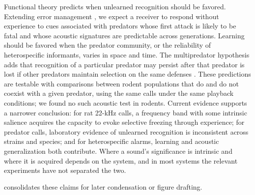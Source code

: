 Functional theory predicts when unlearned recognition should be favored. Extending error management \citep{Nesse2005}, we expect a receiver to respond without experience to cues associated with predators whose first attack is likely to be fatal and whose acoustic signatures are predictable across generations. Learning should be favored when the predator community, or the reliability of heterospecific informants, varies in space and time. The multipredator hypothesis adds that recognition of a particular predator may persist after that predator is lost if other predators maintain selection on the same defenses \citep{Blumstein2006}. These predictions are testable with comparisons between rodent populations that do and do not coexist with a given predator, using the same calls under the same playback conditions; we found no such acoustic test in rodents. Current evidence supports a narrower conclusion: for rat 22-kHz calls, a frequency band with some intrinsic salience acquires the capacity to evoke selective freezing through experience; for predator calls, laboratory evidence of unlearned recognition is inconsistent across strains and species; and for heterospecific alarms, learning and acoustic generalization both contribute. Where a sound's significance is intrinsic and where it is acquired depends on the system, and in most systems the relevant experiments have not separated the two.

 consolidates these claims for later condensation or figure drafting.


